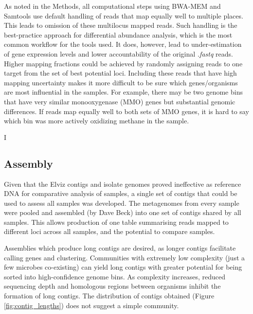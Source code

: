 As noted in the Methods, all computational steps using BWA-MEM and Samtools use default handling of reads that map equally well to multiple places.
This leads to omission of these multilocus mapped reads.
Such handling is the best-practice approach for differential abundance analysis, which is the most common workflow for the tools used.
It does, however, lead to under-estimation of gene expression levels and lower accountability of the original \textit{.fastq} reads. %
Higher mapping fractions could be achieved by randomly assigning reads to one target from the set of best potential loci.
Including these reads that have high mapping uncertainty makes it more difficult to be sure which genes/organisms are most influential in the samples.
For example, there may be two genome bins that have very similar monooxygenase (MMO) genes \cite{gilbert2000} but substantial genomic differences.
If reads map equally well to both sets of MMO genes, it is hard to say which bin was more actively oxidizing methane in the sample.

I
\subsection{Assembly}

Given that the Elviz contigs and isolate genomes proved ineffective as reference DNA for comparative analysis of samples, a single set of contigs that could be used to assess all samples was developed.
The metagenomes from every sample were pooled and assembled (by Dave Beck) into one set of contigs shared by all samples.
This allows production of one table summarising reads mapped to different loci across all samples, and the potential to compare samples.

Assemblies which produce long contigs are desired, as longer contigs facilitate calling genes and clustering.
Communities with extremely low complexity (just a few microbes co-existing) can yield long contigs with greater potential for being sorted into high-confidence genome bins. %
As complexity increases, reduced sequencing depth and homologous regions between organisms inhibit the formation of long contigs.
The distribution of contigs obtained (Figure \ref{fig:contig_lengths}) does not suggest a simple community.


